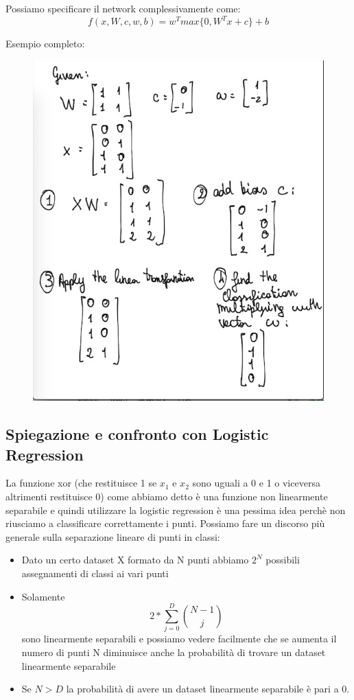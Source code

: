\documentclass[14pt]{extreport}
\begin{document}
Possiamo specificare il network complessivamente come: $$f(x, W, c, w, b) = w^T max\{0, W^Tx+c\}+b$$

Esempio completo:

\begin{figure}[H]
	\centering
	\includegraphics[width=0.7\linewidth]{357.jpeg}
\end{figure}

\subsection{Spiegazione e confronto con Logistic Regression}

La funzione xor (che restituisce 1 se $x_1$ e $x_2$ sono uguali a 0 e 1 o viceversa altrimenti restituisce 0) come abbiamo detto è una funzione non
linearmente separabile e quindi utilizzare la logistic regression è una pessima idea perchè non riusciamo a classificare correttamente i punti.
Possiamo fare un discorso più generale sulla separazione lineare di punti in classi:

\begin{itemize}
	\item Dato un certo dataset X formato da N punti abbiamo $2^N$ possibili assegnamenti di classi ai vari punti
	\item Solamente $$2*\sum_{j=0}^D \binom{N-1}{j}$$ sono linearmente separabili e possiamo vedere facilmente che se aumenta il numero di punti N
	      diminuisce anche la probabilità di trovare un dataset linearmente separabile
	\item Se $N > D$ la probabilità di avere un dataset linearmente separabile è pari a 0.
\end{itemize}
\end{document}

